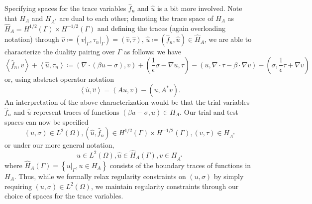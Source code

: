 \documentclass[11pt,onecolumn]{scrartcl}
\newcommand{\LRp}[1]{\left( #1 \right)}
\newcommand{\LRa}[1]{\left\langle #1 \right\rangle}
\newcommand{\LRc}[1]{\left\{ #1 \right\}}
\newcommand{\Grad} {\ensuremath{\nabla}}
\newcommand{\uh}{\widehat{u}}
\newcommand{\fnh}{\widehat{f}_n}
\newcommand{\grad}{\nabla}
\renewcommand{\div}{\grad \cdot}
\begin{document}
Specifying spaces for the trace variables $\fnh$ and $\uh$ is a bit more involved.  Note that $H_{A}$ and $H_{A^*}$ are dual to each other; denoting the trace space of $H_A$ as $\widehat{H}_A = H^{1/2}(\Gamma) \times H^{-1/2}(\Gamma)$ and defining the traces (again overloading notation) through $\widehat{v} \coloneqq \LRp{\left.v\right|_\Gamma, \left.\tau_n\right|_\Gamma} = \LRp{\widehat{v},\widehat{\tau}}$, $\widehat{u} \coloneqq \LRp{\fnh,\uh} \in \widehat{H}_A$, we are able to characterize the duality pairing over $\Gamma$ as follows: we have
\[
\LRa{\fnh,v} + \LRa{\uh,\tau_n} \coloneqq \LRp{\div\LRp{\beta u - \sigma},v} + \LRp{\frac{1}{\epsilon}\sigma - \grad u,\tau} - \LRp{u, \Grad\cdot \tau - \beta\cdot \Grad v} - \LRp{\sigma, \frac{1}{\epsilon}\tau + \Grad v}
\]
or, using abstract operator notation
\[
\LRa{\widehat{u},\widehat{{v}}} = (A{u},{v})-({u},A^*{v}).
\]
An interpretation of the above characterization would be that the trial variables $\fnh$ and $\uh$ represent traces of functions $\LRp{\beta u - \sigma, u} \in H_A$.  Our trial and test spaces can now be specified
\[
\LRp{u,\sigma}\in L^2(\Omega), \LRp{\uh,\fnh}\in H^{1/2}(\Gamma) \times H^{-1/2}(\Gamma), \LRp{v,\tau}\in H_{A^*}
\]
or under our more general notation,
\[
u\in L^2(\Omega), \widehat{u}\in \widehat{H}_{A}(\Gamma), v\in H_{A^*}
\]
where $\widehat{H}_{A}(\Gamma) = \LRc{\left.u\right|_\Gamma, u\in H_A}$ consists of the boundary traces of functions in $H_A$.  
Thus, while we formally relax regularity constraints on $\LRp{u,\sigma}$ by simply requiring $\LRp{u,\sigma} \in L^2(\Omega)$, we maintain regularity constraints through our choice of spaces for the trace variables.  
\end{document}
